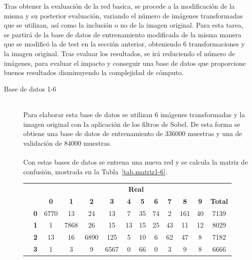 Tras obtener la evaluación de la red basica, se procede a la modificación de la misma y su posterior evaluación, variando el número de imágenes transformadas que se utilizan, así como la inclusión o no de la imagen original. Para esta tarea, se partirá de la base de datos de entrenamiento modificada de la misma manera que se modificó la de test en la sección anterior, obteniendo 6 transformaciones y la imagen original. Tras evaluar los resultados, se irá reduciendo el número de imágenes, para evaluar el impacto y conseguir una base de datos que proporcione buenos resultados disminuyendo la complejidad de cómputo.
\vspace{5pt}

\begin{description}
	\item[Base de datos 1-6] \hfill 
	\vspace{5pt}
	\\
	Para elaborar esta base de datos se utilizan 6 imágenes transformadas y la imagen original con la aplicación de los filtros de Sobel. De esta forma se obtiene una base de datos de entrenamiento de 336000 muestras y una de validación de 84000 muestras.\\
	\vspace{-10pt}
	\\
	Con estas bases de datos se entrena una nueva red y se calcula la matriz de confusión, mostrada en la Tabla~\ref{tab.matriz1-6}.
	\begin{table}[H]
		\centering
		\begin{tabular}{|c|l|c|c|c|c|c|c|c|c|c|c|c|}
			\cline{3-13}  
			\multicolumn{2}{c|}{} & \multicolumn{11}{c|}{\textbf{Real}} \\ \cline{3-13} 
			\multicolumn{2}{c|}{} & \textbf{0} & \textbf{1} & \textbf{2} &  \textbf{3} & \textbf{4} & \textbf{5} & \textbf{6} & \textbf{7} & \textbf{8} & \textbf{9} & \textbf{Total}\\ \hline
			\multirow{10}{0.5cm}{\rotatebox{90}{\textbf{Predicción}}}& \textbf{0} & \cellcolor{lightgray}6770 & 13 & 24 & 13 & 7 & 35 & 74 & 2 & 161 & 40 & 7139\\ \cline{2-13}
			& \textbf{1} & 1 & \cellcolor{lightgray}7868 & 26 & 15 & 13 & 15 & 25 & 43 & 11 & 12 & 8029\\ \cline{2-13}
			& \textbf{2} & 13 & 16 & \cellcolor{lightgray}6890 & 125 & 5 & 10 & 6 & 62 & 47 & 8 & 7182\\ \cline{2-13}
			& \textbf{3} & 1 & 3 & 9 & \cellcolor{lightgray}6567 & 0 & 66 & 0 & 3 & 9 & 8 & 6666\\ \cline{2-13}

\end{tabular}
\end{table}
\end{description}
